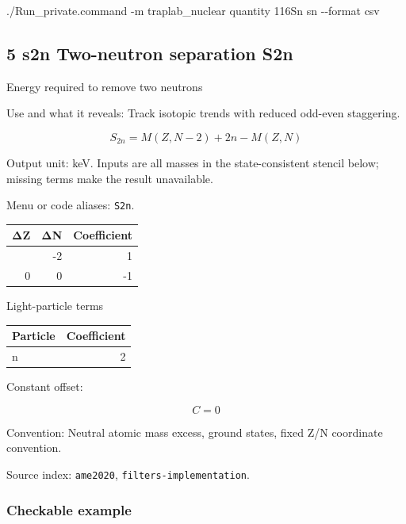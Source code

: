 \documentclass[
  11pt,
  letterpaper,
]{article}
\newenvironment{Shaded}{}{}
\newcommand{\AttributeTok}[1]{\textcolor[rgb]{0.49,0.56,0.16}{#1}}
\newcommand{\ExtensionTok}[1]{#1}
\newcommand{\NormalTok}[1]{#1}
\begin{document}
\begin{Shaded}
\begin{Highlighting}[]
\ExtensionTok{./Run\_private.command} \AttributeTok{{-}m}\NormalTok{ traplab\_nuclear quantity 116Sn sn }\AttributeTok{{-}{-}format}\NormalTok{ csv}
\end{Highlighting}
\end{Shaded}

\subsection{5 s2n Two-neutron separation
S2n}\label{s2n-two-neutron-separation-s2n}

Energy required to remove two neutrons

Use and what it reveals: Track isotopic trends with reduced odd-even
staggering.

\[
S_{2n}=M(Z,N-2)+2n-M(Z,N)
\]

Output unit: keV. Inputs are all masses in the state-consistent stencil
below; missing terms make the result unavailable.

Menu or code aliases: \texttt{S2n}.

\begin{longtable}[]{@{}rrr@{}}
\toprule\noalign{}
ΔZ & ΔN & Coefficient \\
\midrule\noalign{}
\endhead
\bottomrule\noalign{}
\endlastfoot
0 & -2 & 1 \\
0 & 0 & -1 \\
\end{longtable}

Light-particle terms

\begin{longtable}[]{@{}lr@{}}
\toprule\noalign{}
Particle & Coefficient \\
\midrule\noalign{}
\endhead
\bottomrule\noalign{}
\endlastfoot
n & 2 \\
\end{longtable}

Constant offset:

\[
C=0
\]

Convention: Neutral atomic mass excess, ground states, fixed Z/N
coordinate convention.

Source index: \texttt{ame2020}, \texttt{filters-implementation}.

\subsubsection{Checkable example}\label{checkable-example-4}
\end{document}
